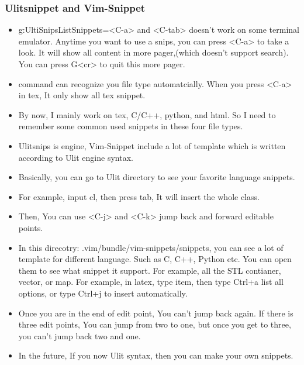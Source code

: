 \documentclass[a4paper,11pt,twoside]{book}
\begin{document}
\subsubsection{Ulitsnippet and Vim-Snippet}
\begin{itemize}
		\item g:UltiSnipsListSnippets=<C-a> and <C-tab> doesn't work on some terminal emulator. Anytime you want to use a snips, you can press <C-a> to take a look. It will show all content in more pager,(which doesn't support search). You can press G<cr> to quit this more pager.

		\item <C-a> command can recognize you file type automatcially. When you press <C-a> in tex, It only show all tex snippet. 

		\item By now, I mainly work on tex, C/C++, python, and html. So I need to remember some common used snippets in these four file types. 

		\item Ulitsnips is engine, Vim-Snippet include a lot of template which is written according to Ulit engine syntax. 

		\item Basically, you can go to Ulit directory to see your favorite language snippets. 

		\item For example, input cl, then press tab, It will insert the whole class. 

		\item Then, You can use <C-j> and <C-k> jump back and forward editable points. 

		\item In this direcotry: .vim/bundle/vim-snippets/snippets, you can see a lot of template for different language. Such as C, C++, Python etc. You can open them to see what snippet it support. For example, all the STL contianer, vector, or map. For example, in latex, type item, then type Ctrl+a list all options, or type Ctrl+j to insert automatically. 

		\item Once you are in the end of edit point, You can't jump back again. If there is three edit points, You can jump from two to one, but once you get to three, you can't jump back two and one. 

		\item In the future, If you now Ulit syntax, then you can make your own snippets. 


\end{itemize}
\end{document}
